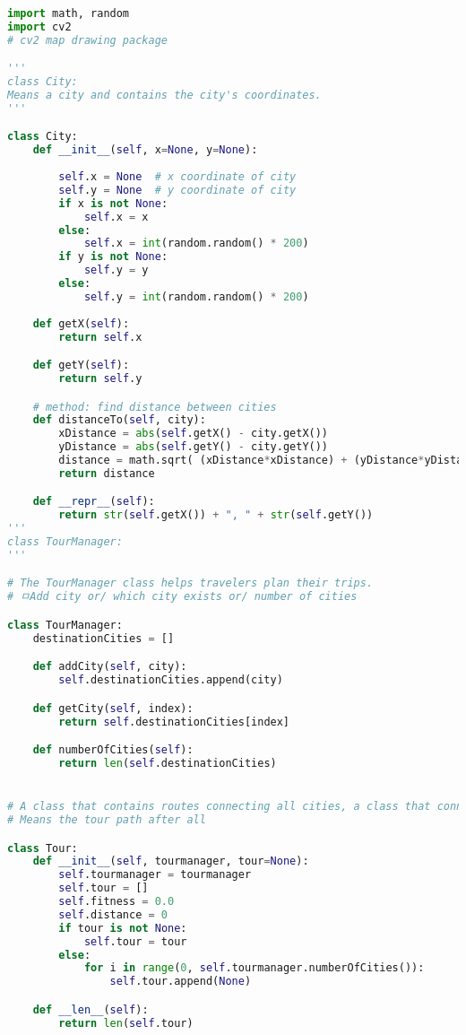\documentclass[12pt]{article}
\begin{document}
    \begin{lstlisting}[language=Python]
import math, random
import cv2
# cv2 map drawing package

'''
class City:
Means a city and contains the city's coordinates.
'''

class City:
    def __init__(self, x=None, y=None):
        
        self.x = None  # x coordinate of city
        self.y = None  # y coordinate of city
        if x is not None:
            self.x = x
        else:
            self.x = int(random.random() * 200)
        if y is not None:
            self.y = y
        else:
            self.y = int(random.random() * 200)
   
    def getX(self):
        return self.x

    def getY(self):
        return self.y

    # method: find distance between cities
    def distanceTo(self, city): 
        xDistance = abs(self.getX() - city.getX())
        yDistance = abs(self.getY() - city.getY())
        distance = math.sqrt( (xDistance*xDistance) + (yDistance*yDistance) )
        return distance

    def __repr__(self):
        return str(self.getX()) + ", " + str(self.getY())
'''
class TourManager:
'''

# The TourManager class helps travelers plan their trips.
# ㅁAdd city or/ which city exists or/ number of cities

class TourManager:
    destinationCities = []

    def addCity(self, city):
        self.destinationCities.append(city)

    def getCity(self, index):
        return self.destinationCities[index]

    def numberOfCities(self):
        return len(self.destinationCities)


# A class that contains routes connecting all cities, a class that connects cities
# Means the tour path after all

class Tour:
    def __init__(self, tourmanager, tour=None):
        self.tourmanager = tourmanager
        self.tour = []
        self.fitness = 0.0
        self.distance = 0
        if tour is not None:
            self.tour = tour
        else:
            for i in range(0, self.tourmanager.numberOfCities()):
                self.tour.append(None)

    def __len__(self):
        return len(self.tour)


\end{lstlisting}
\end{document}
